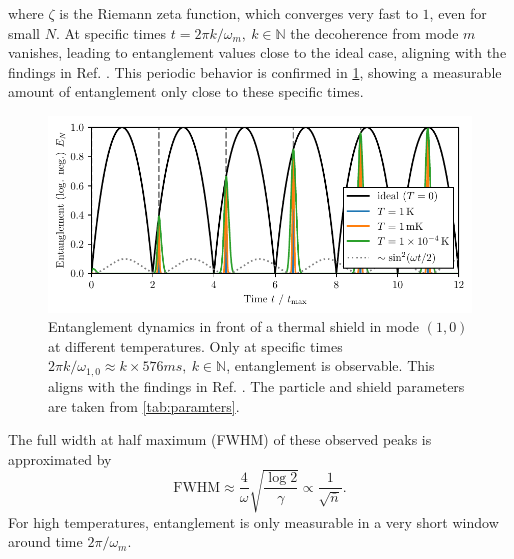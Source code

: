 where $\zeta$ is the Riemann zeta function, which converges very fast to $1$, even for small $N$.
At specific times $t=2\pi k/\omega_m, \ k\in\mathbb{N}$ the decoherence from mode $m$ vanishes, leading to entanglement values close to the ideal case, aligning with the findings in Ref. \cite{Pedernales_2022}.
This periodic behavior is confirmed in \cref{fig:5:entanglement-time-single-mode}, showing a measurable amount of entanglement only close to these specific times.
\begin{figure}[!htbp]
  \centering
  \includegraphics[width=\textwidth]{./../figures/vibrations/entanglement-hamiltonian.pdf}
  \caption{Entanglement dynamics in front of a thermal shield in mode $(1,0)$ at different temperatures. Only at specific times $2\pi k / \omega_{1,0} \approx k\times 576\si{ms},\ k\in\mathbb{N}$, entanglement is observable. This aligns with the findings in Ref. \cite{Pedernales_2022}. The particle and shield parameters are taken from \cref{tab:paramters}.}
  \label{fig:5:entanglement-time-single-mode}
\end{figure}
The full width at half maximum (FWHM) of these observed peaks is approximated by
\begin{equation}
  \mathrm{FWHM} \approx \frac{4}{\omega}\sqrt{\frac{\log 2}{\gamma}} \propto \frac{1}{\sqrt{\bar{n}}} .
\end{equation}
For high temperatures, entanglement is only measurable in a very short window around time $2\pi / \omega_m$.

